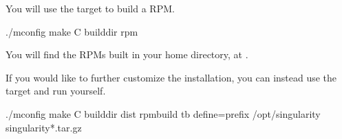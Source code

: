 \documentclass[letterpaper,10pt,english]{sphinxmanual}
\begin{document}
You will use the   target to build a  RPM.

%
\begin{sphinxVerbatim}[commandchars=\\\{\}]
\PYGZdl{} ./mconfig
\PYGZdl{} make \PYGZhy{}C builddir rpm
\end{sphinxVerbatim}

You will find the  RPMs built in your home directory,
at .

If you would like to further customize the  installation,
you can instead use the   target and run 
yourself.

%
\begin{sphinxVerbatim}[commandchars=\\\{\}]
\PYGZdl{} ./mconfig
\PYGZdl{} make \PYGZhy{}C builddir dist
\PYGZdl{} rpmbuild \PYGZhy{}tb \PYGZhy{}\PYGZhy{}define=\PYGZdq{}\PYGZus{}prefix /opt/singularity\PYGZdq{} singularity\PYGZhy{}*.tar.gz
\end{sphinxVerbatim}



\renewcommand{\indexname}{Index}
\printindex
\end{document}
